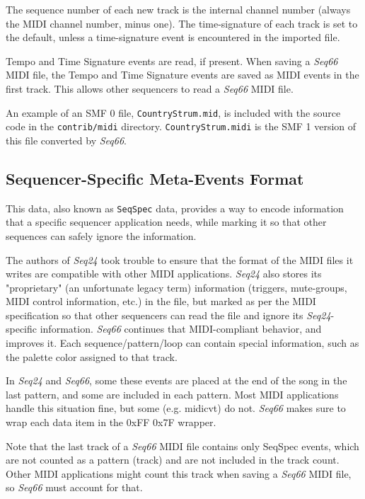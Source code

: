    The sequence number of each new track is the internal channel number
   (always the MIDI channel number, minus one).
   The time-signature of each track is set to the default, unless a
   time-signature event is encountered in the imported file.

   Tempo and Time Signature events are read, if present.
   When saving a \textsl{Seq66} MIDI file,
   the Tempo and Time Signature events are saved as MIDI events in
   the first track.
   This allows other sequencers to read a \textsl{Seq66} MIDI file.

   An example of an SMF 0 file, \texttt{CountryStrum.mid}, is included with
   the source code in the \texttt{contrib/midi} directory.
   \texttt{CountryStrum.midi} is the SMF 1 version of this file converted by
   \textsl{Seq66}.

\subsection{Sequencer-Specific Meta-Events Format}
\label{subsec:midi_format_meta_format}

   This data, also known as
   \texttt{SeqSpec} data, provides a way to encode information
   that a specific sequencer application needs, while marking it so that other
   sequences can safely ignore the information.

   The authors of \textsl{Seq24} took trouble to ensure that the format
   of the MIDI files it writes are compatible with other MIDI applications.
   \textsl{Seq24} also stores its "proprietary" (an unfortunate legacy term)
   information (triggers, mute-groups, MIDI control
   information, etc.) in the file, but marked as per the MIDI specification
   so that other sequencers can read
   the file and ignore its \textsl{Seq24}-specific information.
   \textsl{Seq66} continues that MIDI-compliant behavior, and improves it.
   Each sequence/pattern/loop can contain special information, such as the
   palette color assigned to that track.

   In \textsl{Seq24} and \textsl{Seq66},
   some these events are placed at the end of the song in the last pattern,
   and some are included in each pattern.
   Most MIDI applications handle this situation
   fine, but some (e.g. midicvt) do not.  \textsl{Seq66} makes
   sure to wrap each data item in the 0xFF 0x7F wrapper.

   Note that the last track of a \textsl{Seq66} MIDI file contains
   only SeqSpec events, which are not counted as a pattern (track) and
   are not included in the track count.
   Other MIDI applications might count this track when saving a
   \textsl{Seq66} MIDI file, so \textsl{Seq66} must account for that.

